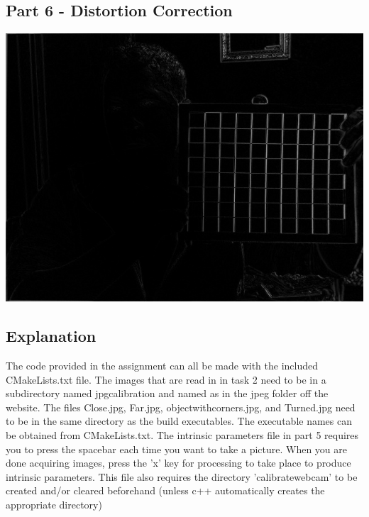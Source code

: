 \documentclass[12pt,a4paper,final]{article}
\begin{document}
\subsection*{Part 6 - Distortion Correction}

\includegraphics[scale=0.25]{webcam1}

\subsection*{Explanation}

The code provided in the assignment can all be made with the included CMakeLists.txt file. The images that are read in in task 2 need to be in a subdirectory named jpg\textunderscore calibration and named as in the jpeg folder off the website. The files Close.jpg, Far.jpg, object\textunderscore with\textunderscore corners.jpg, and Turned.jpg need to be in the same directory as the build executables. The executable names can be obtained from CMakeLists.txt. The intrinsic parameters file in part 5 requires you to press the spacebar each time you want to take a picture. When you are done acquiring images, press the 'x' key for processing to take place to produce intrinsic parameters. This file also requires the directory 'calibrate\textunderscore webcam' to be created and/or cleared beforehand (unless c++ automatically creates the appropriate directory)
\end{document}
